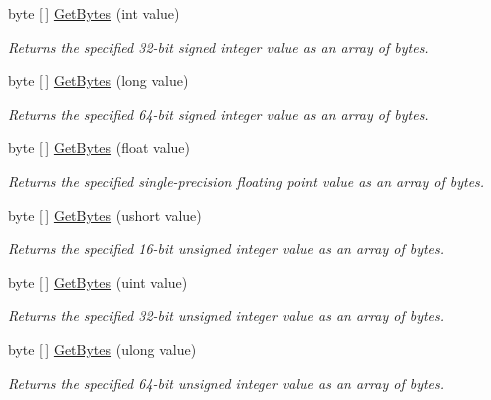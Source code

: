 \begin{DoxyCompactItemize}
byte \mbox{[}$\,$\mbox{]} \mbox{\hyperlink{class_t_net_1_1_i_o_1_1_endian_bit_converter_a116e1d710499764287b46c7bd76ce00e}{Get\+Bytes}} (int value)
\begin{DoxyCompactList}\small\item\em Returns the specified 32-\/bit signed integer value as an array of bytes. \end{DoxyCompactList}\item 
byte \mbox{[}$\,$\mbox{]} \mbox{\hyperlink{class_t_net_1_1_i_o_1_1_endian_bit_converter_a3c9aae4ed4eb806f97a5b29dd47ad484}{Get\+Bytes}} (long value)
\begin{DoxyCompactList}\small\item\em Returns the specified 64-\/bit signed integer value as an array of bytes. \end{DoxyCompactList}\item 
byte \mbox{[}$\,$\mbox{]} \mbox{\hyperlink{class_t_net_1_1_i_o_1_1_endian_bit_converter_a473401216eb8158e500667635eb10e28}{Get\+Bytes}} (float value)
\begin{DoxyCompactList}\small\item\em Returns the specified single-\/precision floating point value as an array of bytes. \end{DoxyCompactList}\item 
byte \mbox{[}$\,$\mbox{]} \mbox{\hyperlink{class_t_net_1_1_i_o_1_1_endian_bit_converter_aeda4cf603ad487bb18ec95f947a1664b}{Get\+Bytes}} (ushort value)
\begin{DoxyCompactList}\small\item\em Returns the specified 16-\/bit unsigned integer value as an array of bytes. \end{DoxyCompactList}\item 
byte \mbox{[}$\,$\mbox{]} \mbox{\hyperlink{class_t_net_1_1_i_o_1_1_endian_bit_converter_a5a69ebad933ce89df339a41b7d1bf6c4}{Get\+Bytes}} (uint value)
\begin{DoxyCompactList}\small\item\em Returns the specified 32-\/bit unsigned integer value as an array of bytes. \end{DoxyCompactList}\item 
byte \mbox{[}$\,$\mbox{]} \mbox{\hyperlink{class_t_net_1_1_i_o_1_1_endian_bit_converter_a74f57e3195722e1f5d6f3049fcb1fe82}{Get\+Bytes}} (ulong value)
\begin{DoxyCompactList}\small\item\em Returns the specified 64-\/bit unsigned integer value as an array of bytes. \end{DoxyCompactList}\item 

\end{DoxyCompactItemize}
